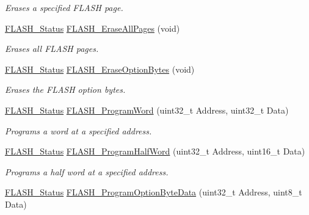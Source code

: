 \begin{DoxyCompactItemize}
\begin{DoxyCompactList}\small\item\em Erases a specified F\+L\+A\+SH page. \end{DoxyCompactList}\item 
\hyperlink{group___f_l_a_s_h___exported___types_gadc63a6f3404ff1f71229a66915e9cdc0}{F\+L\+A\+S\+H\+\_\+\+Status} \hyperlink{group___f_l_a_s_h___exported___functions_gab2e6dea62c72b3e47c17512579d37498}{F\+L\+A\+S\+H\+\_\+\+Erase\+All\+Pages} (void)
\begin{DoxyCompactList}\small\item\em Erases all F\+L\+A\+SH pages. \end{DoxyCompactList}\item 
\hyperlink{group___f_l_a_s_h___exported___types_gadc63a6f3404ff1f71229a66915e9cdc0}{F\+L\+A\+S\+H\+\_\+\+Status} \hyperlink{group___f_l_a_s_h___exported___functions_ga152768609e85d74a9d8474be8dc2874b}{F\+L\+A\+S\+H\+\_\+\+Erase\+Option\+Bytes} (void)
\begin{DoxyCompactList}\small\item\em Erases the F\+L\+A\+SH option bytes. \end{DoxyCompactList}\item 
\hyperlink{group___f_l_a_s_h___exported___types_gadc63a6f3404ff1f71229a66915e9cdc0}{F\+L\+A\+S\+H\+\_\+\+Status} \hyperlink{group___f_l_a_s_h___exported___functions_gaac9a2f400b92537bd42a6bd7cc237b11}{F\+L\+A\+S\+H\+\_\+\+Program\+Word} (uint32\+\_\+t Address, uint32\+\_\+t Data)
\begin{DoxyCompactList}\small\item\em Programs a word at a specified address. \end{DoxyCompactList}\item 
\hyperlink{group___f_l_a_s_h___exported___types_gadc63a6f3404ff1f71229a66915e9cdc0}{F\+L\+A\+S\+H\+\_\+\+Status} \hyperlink{group___f_l_a_s_h___exported___functions_ga5c1336f667950a8765887228f1d0d501}{F\+L\+A\+S\+H\+\_\+\+Program\+Half\+Word} (uint32\+\_\+t Address, uint16\+\_\+t Data)
\begin{DoxyCompactList}\small\item\em Programs a half word at a specified address. \end{DoxyCompactList}\item 
\hyperlink{group___f_l_a_s_h___exported___types_gadc63a6f3404ff1f71229a66915e9cdc0}{F\+L\+A\+S\+H\+\_\+\+Status} \hyperlink{group___f_l_a_s_h___exported___functions_ga1382ff9d4ded8a5c076fde4fff529d21}{F\+L\+A\+S\+H\+\_\+\+Program\+Option\+Byte\+Data} (uint32\+\_\+t Address, uint8\+\_\+t Data)

\end{DoxyCompactItemize}
